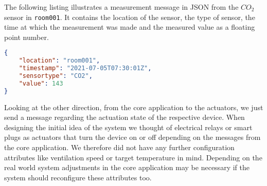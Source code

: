 The following listing illustrates a measurement message in JSON from the $CO_2$ sensor in \texttt{room001}.
It contains the location of the sensor, the type of sensor, the time at which the measurement was made and the measured value as a floating point number.

\begin{lstlisting}[language=json, 
    caption={Example measurement message from a sensor in JSON format}, 
    captionpos=b]
{
    "location": "room001",
    "timestamp": "2021-07-05T07:30:01Z",
    "sensortype": "CO2",
    "value": 143
}
\end{lstlisting}
Looking at the other direction, from the core application to the actuators, we just send a message regarding the actuation state of the respective device.
When designing the initial idea of the system we thought of electrical relays or smart plugs as actuators that turn the device on or off depending on the messages from the core application.
We therefore did not have any further configuration attributes like ventilation speed or target temperature in mind.
Depending on the real world system adjustments in the core application may be necessary if the system should reconfigure these attributes too.

\pagebreak